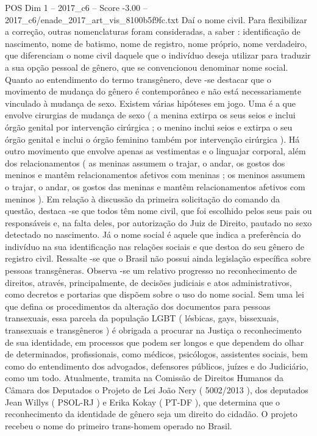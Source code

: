 \begin{textsample}{POS Dim 1 – 2017\_c6 – Score -3.00 – 2017\_c6/enade\_2017\_art\_vis\_8100b5f9fc.txt}
Daí o nome civil.
Para flexibilizar a correção, outras nomenclaturas foram consideradas, a saber : identificação de nascimento, nome de batismo, nome de registro, nome próprio, nome verdadeiro, que diferenciam o nome civil daquele que o indivíduo deseja utilizar para traduzir a sua opção pessoal de gênero, que se convencionou denominar nome social.
Quanto ao entendimento do termo transgênero, deve -se destacar que o movimento de mudança do gênero é contemporâneo e não está necessariamente vinculado à mudança de sexo.
Existem várias hipóteses em jogo.
Uma é a que envolve cirurgias de mudança de sexo ( a menina extirpa os seus seios e inclui órgão genital por intervenção cirúrgica ; o menino inclui seios e extirpa o seu órgão genital e inclui o órgão feminino também por intervenção cirúrgica ).
Há outro movimento que envolve apenas as vestimentas e o linguajar corporal, além dos relacionamentos ( as meninas assumem o trajar, o andar, os gostos dos meninos e mantêm relacionamentos afetivos com meninas ; os meninos assumem o trajar, o andar, os gostos das meninas e mantêm relacionamentos afetivos com meninos ).
Em relação à discussão da primeira solicitação do comando da questão, destaca -se que todos têm nome civil, que foi escolhido pelos seus pais ou responsáveis e, na falta deles, por autorização do Juiz de Direito, pautado no sexo detectado no nascimento.
Já o nome social é aquele que indica a preferência do indivíduo na sua identificação nas relações sociais e que destoa do seu gênero de registro civil.
Ressalte -se que o Brasil não possui ainda legislação específica sobre pessoas transgêneras.
Observa -se um relativo progresso no reconhecimento de direitos, através, principalmente, de decisões judiciais e atos administrativos, como decretos e portarias que dispõem sobre o uso do nome social.
Sem uma lei que defina os procedimentos da alteração dos documentos para pessoas transexuais, essa parcela da população LGBT ( lésbicas, gays, bissexuais, transexuais e transgêneros ) é obrigada a procurar na Justiça o reconhecimento de sua identidade, em processos que podem ser longos e que dependem do olhar de determinados, profissionais, como médicos, psicólogos, assistentes sociais, bem como do entendimento dos advogados, defensores públicos, juízes e do Judiciário, como um todo.
Atualmente, tramita na Comissão de Direitos Humanos da Câmara dos Deputados o Projeto de Lei João Nery ( 5002/2013 ), dos deputados Jean Willys ( PSOL-RJ ) e Erika Kokay ( PT-DF ), que determina que o reconhecimento da identidade de gênero seja um direito do cidadão.
O projeto recebeu o nome do primeiro trans-homem operado no Brasil.

\end{textsample}
